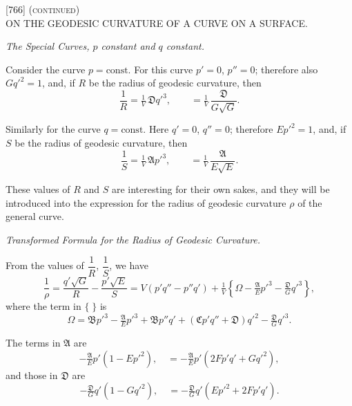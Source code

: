 \documentclass[11pt,a4paper]{article}
\begin{document}

\begin{center}
\textsc{[766] (continued)}\\[2pt]
\textsc{ON THE GEODESIC CURVATURE OF A CURVE ON A SURFACE.}
\end{center}

\bigskip

\begin{center}
\textit{The Special Curves, $p$ constant and $q$ constant.}
\end{center}

Consider the curve $p=\text{const.}$ For this curve $p'=0$, $p''=0$;
therefore also $Gq'^{2}=1$, and, if $R$ be the radius of geodesic
curvature, then
\[
  \frac{1}{R}=\tfrac{1}{V}\,\mathfrak{D}q'^{3}, \qquad
  =\tfrac{1}{V}\,\frac{\mathfrak{D}}{G\sqrt{G}}.
\]

Similarly for the curve $q=\text{const.}$ Here $q'=0$, $q''=0$;
therefore $Ep'^{2}=1$, and, if $S$ be the radius of geodesic curvature,
then
\[
  \frac{1}{S}=\tfrac{1}{V}\,\mathfrak{A}p'^{3}, \qquad
  =\tfrac{1}{V}\,\frac{\mathfrak{A}}{E\sqrt{E}}.
\]

These values of $R$ and $S$ are interesting for their own sakes, and
they will be introduced into the expression for the radius of geodesic
curvature $\rho$ of the general curve.

\begin{center}
\textit{Transformed Formula for the Radius of Geodesic Curvature.}
\end{center}

From the values of $\dfrac{1}{R}$, $\dfrac{1}{S}$, we have
\[
  \frac{1}{\rho}=\frac{q'\sqrt{G}}{R}-\frac{p'\sqrt{E}}{S}
  = V(p'q''-p''q')+\tfrac{1}{V}\!\left\{\Omega-\tfrac{\mathfrak{A}}{E}p'^{3}-\tfrac{\mathfrak{D}}{G}q'^{3}\right\},
\]
where the term in $\{\;\}$ is
\[
  \Omega=\mathfrak{B}p'^{3}-\tfrac{\mathfrak{A}}{E}p'^{3}+\mathfrak{B}p''q'+(\mathfrak{C}p'q''+\mathfrak{D})q'^{2}-\tfrac{\mathfrak{D}}{G}q'^{3}.
\]

The terms in $\mathfrak{A}$ are
\[
  -\tfrac{\mathfrak{A}}{E}p'(1-Ep'^{2}),\quad =-\tfrac{\mathfrak{A}}{E}p'(2Fp'q'+Gq'^{2}),
\]
and those in $\mathfrak{D}$ are
\[
  -\tfrac{\mathfrak{D}}{G}q'(1-Gq'^{2}),\quad =-\tfrac{\mathfrak{D}}{G}q'(Ep'^{2}+2Fp'q').
\]
\end{document}
